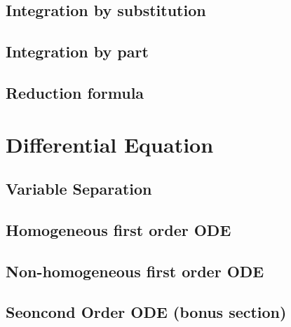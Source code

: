 \documentclass{article}
\theoremstyle{definition}
\theoremstyle{definition}
\theoremstyle{definition}
\theoremstyle{definition}
\theoremstyle{definition}
\theoremstyle{definition}
\theoremstyle{definition}
\theoremstyle{definition}
\theoremstyle{definition}
\begin{document}
\subsection{Integration by substitution}
\subsection{Integration by part}
\subsection{Reduction formula}

\section{Differential Equation}
\subsection{Variable Separation}
\subsection{Homogeneous first order ODE}
\subsection{Non-homogeneous first order ODE}
\subsection{Seoncond Order ODE (bonus section)}
\end{document}
